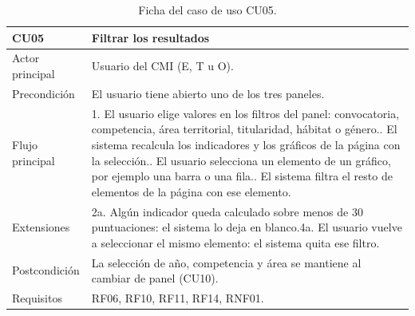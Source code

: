 \documentclass[12pt, a4paper, oneside]{report}
\begin{document}
\begin{table}[!tbp]
\centering
\small
{}\renewcommand{\arraystretch}{1.1}
\begin{tabularx}{\textwidth}{@{} >{\raggedright\arraybackslash}p{2.8cm} X @{}}
\toprule
\textbf{CU05} & \textbf{Filtrar los resultados} \\ \midrule
Actor principal & Usuario del CMI (E, T u O). \\ \addlinespace
Precondición & El usuario tiene abierto uno de los tres paneles. \\ \addlinespace
Flujo principal & 1. El usuario elige valores en los filtros del panel: convocatoria, competencia, área territorial, titularidad, hábitat o género.\newline 2. El sistema recalcula los indicadores y los gráficos de la página con la selección.\newline 3. El usuario selecciona un elemento de un gráfico, por ejemplo una barra o una fila.\newline 4. El sistema filtra el resto de elementos de la página con ese elemento. \\ \addlinespace
Extensiones & 2a. Algún indicador queda calculado sobre menos de 30 puntuaciones: el sistema lo deja en blanco.\newline 4a. El usuario vuelve a seleccionar el mismo elemento: el sistema quita ese filtro. \\ \addlinespace
Postcondición & La selección de año, competencia y área se mantiene al cambiar de panel (CU10). \\ \addlinespace
Requisitos & RF06, RF10, RF11, RF14, RNF01. \\ \bottomrule
\end{tabularx}
\caption{Ficha del caso de uso CU05.}
\label{tab:cu05}
\end{table}
\end{document}
